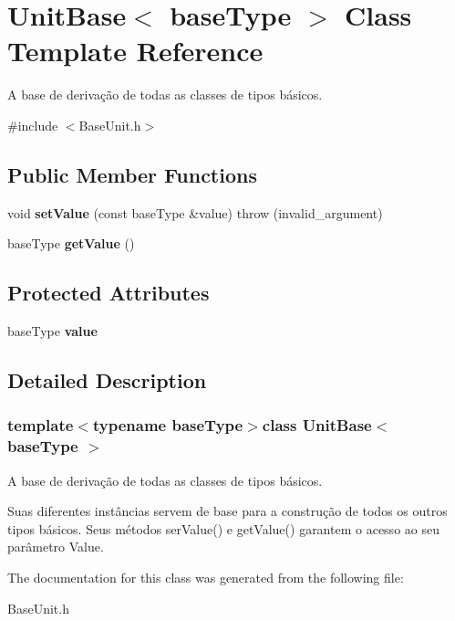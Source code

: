 \hypertarget{classUnitBase}{\section{Unit\-Base$<$ base\-Type $>$ Class Template Reference}
\label{classUnitBase}
}


A base de derivação de todas as classes de tipos básicos.  




{\ttfamily \#include $<$Base\-Unit.\-h$>$}

\subsection*{Public Member Functions}
\begin{DoxyCompactItemize}
\item 
\hypertarget{classUnitBase_af14e2453bc9870f0e04514799585e763}{void {\bfseries set\-Value} (const base\-Type \&value)  throw (invalid\-\_\-argument)}\label{classUnitBase_af14e2453bc9870f0e04514799585e763}

\item 
\hypertarget{classUnitBase_a620b2e9bda880c77d98a3c4cafb8443f}{base\-Type {\bfseries get\-Value} ()}\label{classUnitBase_a620b2e9bda880c77d98a3c4cafb8443f}

\end{DoxyCompactItemize}
\subsection*{Protected Attributes}
\begin{DoxyCompactItemize}
\item 
\hypertarget{classUnitBase_a1c1ad08b45f07a94e5cf71dee734436b}{base\-Type {\bfseries value}}\label{classUnitBase_a1c1ad08b45f07a94e5cf71dee734436b}

\end{DoxyCompactItemize}


\subsection{Detailed Description}
\subsubsection*{template$<$typename base\-Type$>$class Unit\-Base$<$ base\-Type $>$}

A base de derivação de todas as classes de tipos básicos. 

Suas diferentes instâncias servem de base para a construção de todos os outros tipos básicos. Seus métodos ser\-Value() e get\-Value() garantem o acesso ao seu parâmetro Value. 

The documentation for this class was generated from the following file\-:\begin{DoxyCompactItemize}
\item 
Base\-Unit.\-h\end{DoxyCompactItemize}

